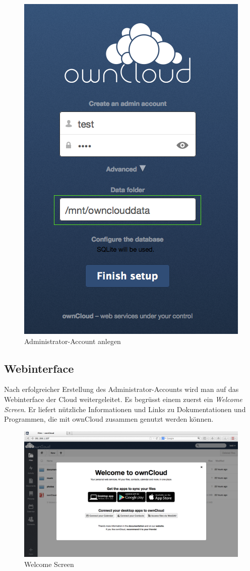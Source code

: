 \begin{figure}[h]
\centering
\includegraphics[scale=0.5]{images/admin_setup}
\caption{Administrator-Account anlegen}
\end{figure}

\subsection{Webinterface}
Nach erfolgreicher Erstellung des Administrator-Accounts wird man auf das Webinterface der Cloud weitergeleitet. Es begrüsst einem zuerst ein \textit{Welcome Screen}. Er liefert nützliche Informationen und Links zu Dokumentationen und Programmen, die mit ownCloud zusammen genutzt werden können.

\begin{figure}[h]
\centering
\includegraphics[scale=0.4]{images/welcomescreen}
\caption{Welcome Screen}
\end{figure}

